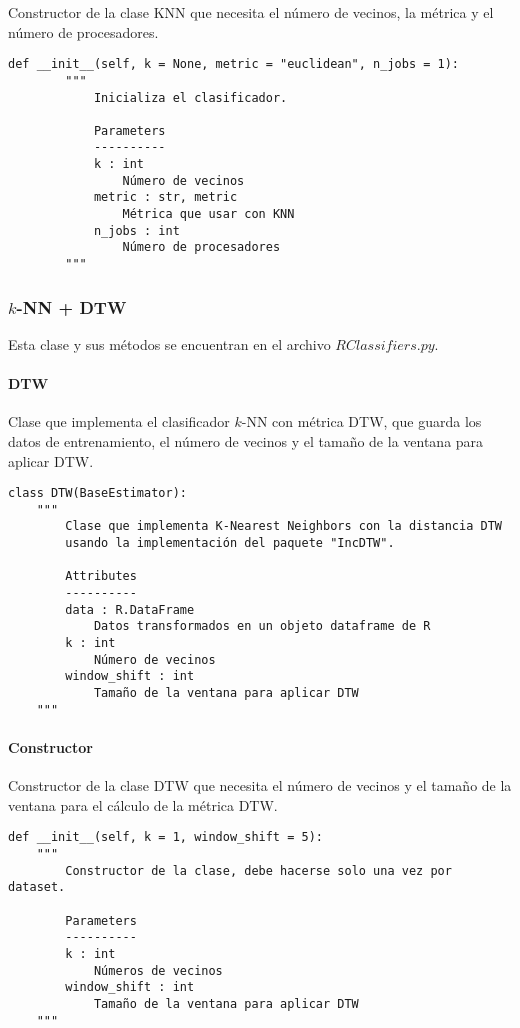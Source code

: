 Constructor de la clase KNN que necesita el número de vecinos, la métrica y el número de procesadores.

\begin{lstlisting}
def __init__(self, k = None, metric = "euclidean", n_jobs = 1):
        """
            Inicializa el clasificador.

            Parameters
            ----------
            k : int
                Número de vecinos
            metric : str, metric
                Métrica que usar con KNN
            n_jobs : int
                Número de procesadores
        """
\end{lstlisting}

\subsubsection{$k$-NN + DTW}

Esta clase y sus métodos se encuentran en el archivo $RClassifiers.py$.

\paragraph{DTW}

Clase que implementa el clasificador $k$-NN con métrica DTW, que guarda los datos de entrenamiento, el número de vecinos y el tamaño de la ventana para aplicar DTW.

\begin{lstlisting}
class DTW(BaseEstimator):
    """
        Clase que implementa K-Nearest Neighbors con la distancia DTW
        usando la implementación del paquete "IncDTW".

        Attributes
        ----------
        data : R.DataFrame
            Datos transformados en un objeto dataframe de R
        k : int
            Número de vecinos
        window_shift : int
            Tamaño de la ventana para aplicar DTW
    """
\end{lstlisting}

\paragraph{Constructor}

Constructor de la clase DTW que necesita el número de vecinos y el tamaño de la ventana para el cálculo de la métrica DTW.

\begin{lstlisting}
def __init__(self, k = 1, window_shift = 5):
    """
        Constructor de la clase, debe hacerse solo una vez por dataset.

        Parameters
        ----------
        k : int
            Números de vecinos
        window_shift : int
            Tamaño de la ventana para aplicar DTW
    """
\end{lstlisting}

